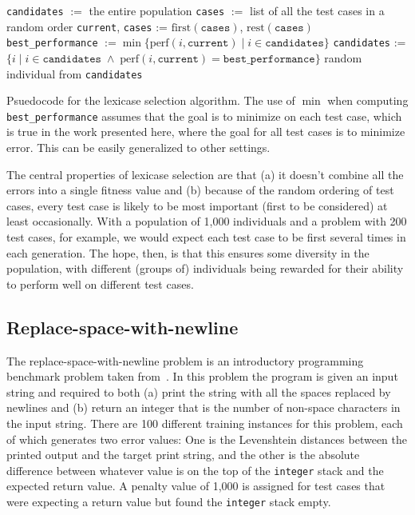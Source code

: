 \begin{algorithm}[tb]
	\begin{algorithmic}
		\STATE \texttt{candidates} $:=$ the entire population
		\STATE \texttt{cases} $:=$ list of all the test cases in a random order
		\STATE \texttt{current}, \texttt{cases} := $\textrm{first}(\texttt{cases})$, $\textrm{rest}(\texttt{cases})$
		\STATE \texttt{best\_performance} $:= \min \{ \textrm{perf}(i, \texttt{current}) \;|\; i \in \texttt{candidates} \}$
		\STATE \texttt{candidates} := $\{ i \;|\; i \in \texttt{candidates} \;\land\; \textrm{perf}(i, \texttt{current}) = \texttt{best\_performance}\}$
		\ENDWHILE
		\RETURN random individual from \texttt{candidates}
	\end{algorithmic}
	\caption{Psuedocode for the lexicase selection algorithm. The use of $\min$ when computing 
		\texttt{best\_performance} assumes that the goal is to minimize on each test case, which
		is true in the work presented here, where the goal for all test cases is to minimize error.
		This can be easily generalized to other settings.}
	\label{alg:lexicase}
\end{algorithm}

The central properties of lexicase selection are that (a) it doesn't combine all the errors into a single
fitness value and (b) because of the random ordering of test cases, every test case is likely to be
most important (first to be considered) at least occasionally. With a population of 1,000 individuals
and a problem with 200 test cases, for example, we would expect each test case to be first several
times in each generation. The hope, then, is that this ensures some diversity in the population, with
different (groups of) individuals being rewarded for their ability to perform well on different test
cases.

\subsection{Replace-space-with-newline}

The replace-space-with-newline problem is an introductory programming benchmark problem taken
from~\citep{Helmuth:2015:GECCO}. In this problem the program is given an input string and required to
both (a) print the string with all the spaces replaced by newlines and (b) return an integer that
is the number of non-space characters in the input string. There are 100 different training instances 
for this problem, each of which generates two error values: One is the Levenshtein distances between
the printed output and the target print string, and the other is the absolute difference between
whatever value is on the top of the \texttt{integer} stack and the expected return value. A penalty
value of 1,000 is assigned for test cases that were expecting a return value but found the
\texttt{integer} stack empty.

